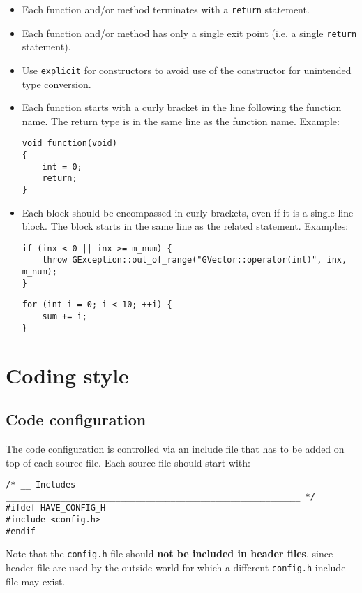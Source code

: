 \documentclass{article}[12pt,a4]
\begin{document}
\begin{itemize}
\item Each function and/or method terminates with a {\tt return} statement.
\item Each function and/or method has only a single exit point (i.e. a single {\tt return} statement).
\item Use {\tt explicit} for constructors to avoid use of the constructor for unintended
type conversion.
\item Each function starts with a curly bracket in the line following the function name.
The return type is in the same line as the function name. Example:
\begin{verbatim}
void function(void)
{
    int = 0;
    return;
}
\end{verbatim}
\item Each block should be encompassed in curly brackets, even if it is a single line block.
The block starts in the same line as the related statement. Examples:
\begin{verbatim}
if (inx < 0 || inx >= m_num) {
    throw GException::out_of_range("GVector::operator(int)", inx, m_num);
}
\end{verbatim}
\begin{verbatim}
for (int i = 0; i < 10; ++i) {
    sum += i;
}
\end{verbatim}
\end{itemize}


\section{Coding style}

\subsection{Code configuration}

The code configuration is controlled via an include file that has to be added on top of
each source file.
Each source file should start with:

\begin{verbatim}
/* __ Includes ___________________________________________________________ */
#ifdef HAVE_CONFIG_H
#include <config.h>
#endif
\end{verbatim}

Note that the {\tt config.h} file should {\bf not be included in header files}, since header file
are used by the outside world for which a different {\tt config.h} include file may exist.
\end{document}
